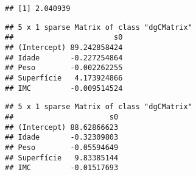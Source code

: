 \documentclass[]{article}
\newenvironment{Shaded}{\begin{snugshade}}{\end{snugshade}}
\newcommand{\DataTypeTok}[1]{\textcolor[rgb]{0.13,0.29,0.53}{#1}}
\newcommand{\DecValTok}[1]{\textcolor[rgb]{0.00,0.00,0.81}{#1}}
\newcommand{\KeywordTok}[1]{\textcolor[rgb]{0.13,0.29,0.53}{\textbf{#1}}}
\newcommand{\NormalTok}[1]{#1}
\newcommand{\OperatorTok}[1]{\textcolor[rgb]{0.81,0.36,0.00}{\textbf{#1}}}
\newcommand{\StringTok}[1]{\textcolor[rgb]{0.31,0.60,0.02}{#1}}
\begin{document}
\begin{Shaded}
\end{Shaded}

\begin{verbatim}
## [1] 2.040939
\end{verbatim}

\begin{Shaded}
\end{Shaded}

\begin{verbatim}
## 5 x 1 sparse Matrix of class "dgCMatrix"
##                       s0
## (Intercept) 89.242858424
## Idade       -0.227254864
## Peso        -0.002262255
## Superfície   4.173924866
## IMC         -0.009514524
\end{verbatim}

\begin{Shaded}
\end{Shaded}

\begin{verbatim}
## 5 x 1 sparse Matrix of class "dgCMatrix"
##                      s0
## (Intercept) 88.62866623
## Idade       -0.32309803
## Peso        -0.05594649
## Superfície   9.83385144
## IMC         -0.01517693
\end{verbatim}
\end{document}
